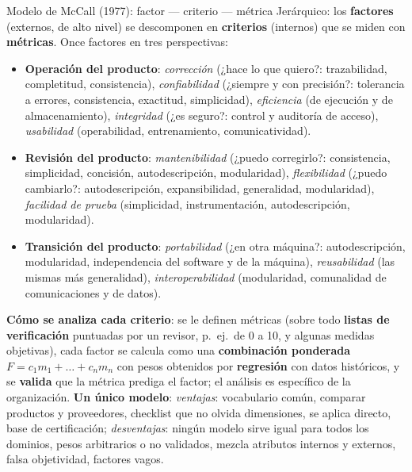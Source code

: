 \documentclass[11pt,a4paper]{article}
\begin{document}
\begin{defbox}{Modelo de McCall (1977): factor --- criterio --- métrica}
Jerárquico: los \textbf{factores} (externos, de alto nivel) se descomponen en \textbf{criterios} (internos) que
se miden con \textbf{métricas}. Once factores en tres perspectivas:
\begin{itemize}[leftmargin=*]
  \item \textbf{Operación del producto}: \emph{corrección} (¿hace lo que quiero?: trazabilidad, completitud,
  consistencia), \emph{confiabilidad} (¿siempre y con precisión?: tolerancia a errores, consistencia, exactitud,
  simplicidad), \emph{eficiencia} (de ejecución y de almacenamiento), \emph{integridad} (¿es seguro?: control y
  auditoría de acceso), \emph{usabilidad} (operabilidad, entrenamiento, comunicatividad).
  \item \textbf{Revisión del producto}: \emph{mantenibilidad} (¿puedo corregirlo?: consistencia, simplicidad,
  concisión, autodescripción, modularidad), \emph{flexibilidad} (¿puedo cambiarlo?: autodescripción,
  expansibilidad, generalidad, modularidad), \emph{facilidad de prueba} (simplicidad, instrumentación,
  autodescripción, modularidad).
  \item \textbf{Transición del producto}: \emph{portabilidad} (¿en otra máquina?: autodescripción, modularidad,
  independencia del software y de la máquina), \emph{reusabilidad} (las mismas más generalidad),
  \emph{interoperabilidad} (modularidad, comunalidad de comunicaciones y de datos).
\end{itemize}
\end{defbox}
\textbf{Cómo se analiza cada criterio}: se le definen métricas (sobre todo \textbf{listas de verificación}
puntuadas por un revisor, p.\ ej.\ de 0 a 10, y algunas medidas objetivas), cada factor se calcula como una
\textbf{combinación ponderada} $F = c_1 m_1 + \dots + c_n m_n$ con pesos obtenidos por \textbf{regresión} con
datos históricos, y se \textbf{valida} que la métrica prediga el factor; el análisis es específico de la
organización. \textbf{Un único modelo}:
\emph{ventajas}: vocabulario común, comparar productos y proveedores, checklist que no olvida dimensiones, se
aplica directo, base de certificación; \emph{desventajas}: ningún modelo sirve igual para todos los dominios,
pesos arbitrarios o no validados, mezcla atributos internos y externos, falsa objetividad, factores vagos.
\end{document}
